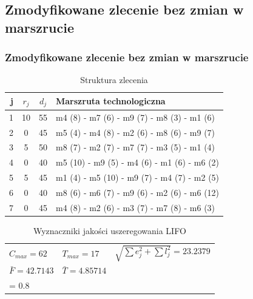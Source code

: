 \documentclass{prezentacja}
\begin{document}
\subsection     {Zmodyfikowane zlecenie bez zmian w marszrucie}
\label{sec:z3}
\begin{frame}
    \frametitle{Zmodyfikowane zlecenie bez zmian w marszrucie}
    \begin{table}[htb]
		\centering
		\caption{\large Struktura zlecenia}
		\scriptsize
		\begin{tabular}{ | r | c | c | l | }
		\hline
		j	& \(r_j\)	& \(d_j\)	& Marszruta technologiczna	\\ \hline
		1	& 10	& 55	& m4 (8) - m7 (6) - m9 (7) - m8 (3) - m1 (6)	\\ \hline
		2	& 0	& 45	& m5 (4) - m4 (8) - m2 (6) - m8 (6) - m9 (7)	\\ \hline
		3	& 5	& 50	& m8 (7) - m2 (7) - m7 (7) - m3 (5) - m1 (4)	\\ \hline
		4	& 0	& 40	& m5 (10) - m9 (5) - m4 (6) - m1 (6) - m6 (2)	\\ \hline
		5	& 5	& 45	& m1 (4) - m5 (10) - m9 (7) - m4 (7) - m2 (5)	\\ \hline
		6	& 0	& 40	& m8 (6) - m6 (7) - m9 (6) - m2 (6) - m6 (12)	\\ \hline
		\rowcolor{lightYellow}
		7	& 0	& 45	& m4 (8) - m2 (6) - m3 (7) - m7 (8) - m6 (3)	\\ \hline
		\end{tabular}
	\end{table}    
    \begin{table}[htb]
        \caption{\large Wyznaczniki jakości uszeregowania LIFO}
        \scriptsize
        \centering
        \begin{tabular}{ l l l }
		\(C_{max} = 62 \)	& \( T_{max} = 17 \)	& \( \sqrt{\sum e_j^2 + \sum l_j^2} = 23.2379\)	\\
		\( \bar{F} = 42.7143 \)	& \( \bar{T} = 4.85714 \)	& \( \alpha*\sum e_j + \beta*\sum l_j \Big|_{\substack{\alpha = 0.2\\ \beta = 0.8}} = 30.4 \)	\\ 
        \end{tabular}
    \end{table}
\end{frame}
\end{document}
